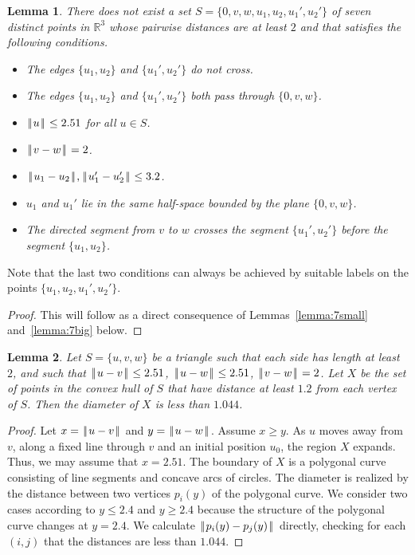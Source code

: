 \documentclass[11pt]{amsart}
\newcommand{\ring}[1]{\mathbb{#1}}
\def\|{{\hskip0.1em|\hskip-0.15em|\hskip0.1em}}
\newtheorem{lemma}{Lemma}
\begin{document}
\begin{lemma}\label{lemma:double-edge} 
There does not exist a set $S=\{0,v,w,u_1,u_2,u_1',u_2'\}$ of seven distinct points
in $\ring{R}^3$ whose pairwise distances are at least $2$ and that satisfies the following conditions.
\begin{itemize}
\item The edges $\{u_1,u_2\}$ and $\{u_1',u_2'\}$ do not cross.
\item The edges $\{u_1,u_2\}$ and $\{u_1',u_2'\}$ both pass through $\{0,v,w\}$.
\item $\|u\|\le 2.51$ for all $u\in S$.
\item $\|v-w\|=2$.
\item $\|u_1-u_2\|,\|u_1'-u_2'\|\le 3.2$.
\item $u_1$ and $u_1'$ lie in the same half-space bounded by the plane $\{0,v,w\}$.
\item The directed segment from $v$ to $w$ crosses the segment $\{u_1',u_2'\}$ before the segment $\{u_1,u_2\}$.
\end{itemize}
\end{lemma}

Note that the last two conditions can always 
be achieved by suitable labels on the points $\{u_1,u_2,u_1',u_2'\}$.

\begin{proof}
This will follow as a direct consequence of Lemmas~\ref{lemma:7small} and~\ref{lemma:7big} below.
\end{proof}

\begin{lemma}\label{lemma:diam} 
Let $S=\{u,v,w\}$ be a triangle such that each side has length at least $2$, and such that $\|u-v\|\le 2.51$, $\|u-w\|\le 2.51$, $\|v-w\|=2$.  Let $X$ be the set of points in the convex hull of $S$ that have distance at least $1.2$ from each vertex of $S$.  Then the diameter of $X$ is less than $1.044$.
\end{lemma}

\begin{proof} Let $x=\|u-v\|$ and $y=\|u-w\|$.  Assume $x\ge y$.  As $u$ moves away from $v$, along a fixed line through $v$ and an initial position $u_0$, the region $X$ expands.  Thus, we may assume that $x=2.51$.   The boundary of $X$ is a polygonal curve consisting of line segments and concave arcs of circles.  The diameter is realized by the distance between two vertices $p_i(y)$ of the polygonal curve. We consider two cases according to $y\le 2.4$ and $y\ge 2.4$ because the structure of the polygonal curve changes at $y=2.4$.  We calculate $\|p_i(y)-p_j(y)\|$ directly, checking for each $(i,j)$ that the distances are less than $1.044$.
\end{proof}
\end{document}
